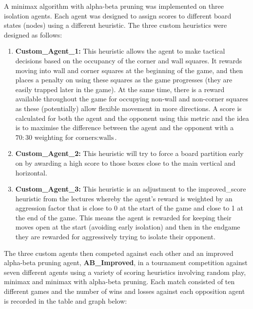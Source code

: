\documentclass[10pt]{article}
\begin{document}
\maketitle

A minimax algorithm with alpha-beta pruning was implemented on three isolation agents. Each agent was designed to assign scores to different board states (nodes) using a different heuristic. The three custom heuristics were designed as follows:

\begin{enumerate}
\item \textbf{Custom\_Agent\_1:} This heuristic allows the agent to make tactical decisions based on the occupancy of the corner and wall squares. It rewards moving into wall and corner squares at the beginning of the game, and then places a penalty on using these squares as the game progresses (they are easily trapped later in the game). At the same time, there is a reward available throughout the game for occupying non-wall and non-corner squares as these (potentially) allow flexible movement in more directions. A score is calculated for both the agent and the opponent using this metric and the idea is to maximise the difference between the agent and the opponent with a $70 : 30$ weighting for $\textrm{corners} : \textrm{walls}$.
\item \textbf{Custom\_Agent\_2:} This heuristic will try to force a board partition early on by awarding a high score to those boxes close to the main vertical and horizontal.
\item \textbf{Custom\_Agent\_3:} This heuristic is an adjustment to the improved\_score heuristic from the lectures whereby the agent's reward is weighted by an aggression factor that is close to 0 at the start of the game and close to 1 at the end of the game. This means the agent is rewarded for keeping their moves open at the start (avoiding early isolation) and then in the endgame they are rewarded for aggressively trying to isolate their opponent.
\end{enumerate}

The three custom agents then competed against each other and an improved alpha-beta pruning agent, \textbf{AB\_Improved}, in a tournament competition against seven different agents using a variety of scoring heuristics involving random play, minimax and minimax with alpha-beta pruning. Each match consisted of ten different games and the number of wins and losses against each opposition agent is recorded in the table and graph below:
\end{document}
